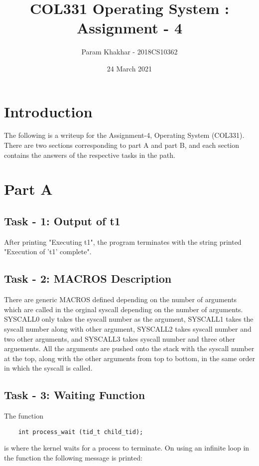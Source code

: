 \documentclass[12pt]{article}
\title{COL331 Operating System : Assignment - 4}
\author{Param Khakhar - 2018CS10362}
\date{24 March 2021}
\begin{document}
\maketitle

\section *{Introduction}

The following is a writeup for the Assignment-4, Operating System (COL331). There are two sections corresponding to part A and part B, and each section contains the answers of the respective tasks in the path.

\section*{Part A}

\subsection*{Task - 1: Output of t1}

After printing "Executing t1", the program terminates with the string printed "Execution of 't1' complete".

\subsection*{Task - 2: MACROS Description}

There are generic MACROS defined depending on the number of arguments which are called in the orginal syscall depending on the number of arguments. SYSCALL0 only takes the syscall number as the argument, SYSCALL1 takes the syscall number along with other argument, SYSCALL2 takes syscall number and two other arguments, and SYSCALL3 takes syscall number and three other arguements. All the arguments are pushed onto the stack with the syscall number at the top, along with the other arguments from top to bottom, in the same order in which the syscall is called.

\subsection*{Task - 3: Waiting Function}
The function
\begin{verbatim}
    int process_wait (tid_t child_tid);
\end{verbatim}

is where the kernel waits for a process to terminate. On using an infinite loop in the function the following message is printed: \\
\end{document}
